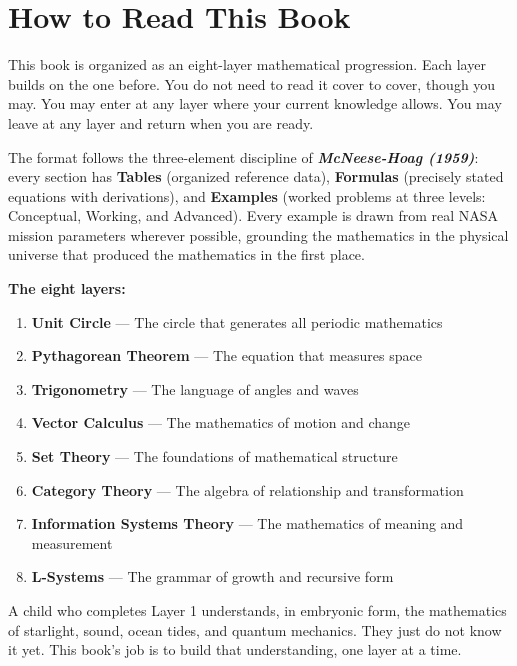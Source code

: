\documentclass[11pt,letterpaper]{book}
\newcommand{\mhref}{\textbf{\textit{McNeese-Hoag (1959)}}}
\begin{document}
\chapter*{How to Read This Book}

This book is organized as an eight-layer mathematical progression. Each layer builds on the one before. You do not need to read it cover to cover, though you may. You may enter at any layer where your current knowledge allows. You may leave at any layer and return when you are ready.

The format follows the three-element discipline of \mhref: every section has \textbf{Tables} (organized reference data), \textbf{Formulas} (precisely stated equations with derivations), and \textbf{Examples} (worked problems at three levels: Conceptual, Working, and Advanced). Every example is drawn from real NASA mission parameters wherever possible, grounding the mathematics in the physical universe that produced the mathematics in the first place.

\textbf{The eight layers:}

\begin{enumerate}[leftmargin=*]
  \item \textbf{Unit Circle} --- The circle that generates all periodic mathematics
  \item \textbf{Pythagorean Theorem} --- The equation that measures space
  \item \textbf{Trigonometry} --- The language of angles and waves
  \item \textbf{Vector Calculus} --- The mathematics of motion and change
  \item \textbf{Set Theory} --- The foundations of mathematical structure
  \item \textbf{Category Theory} --- The algebra of relationship and transformation
  \item \textbf{Information Systems Theory} --- The mathematics of meaning and measurement
  \item \textbf{L-Systems} --- The grammar of growth and recursive form
\end{enumerate}

A child who completes Layer 1 understands, in embryonic form, the mathematics of starlight, sound, ocean tides, and quantum mechanics. They just do not know it yet. This book's job is to build that understanding, one layer at a time.

\tableofcontents
\end{document}
